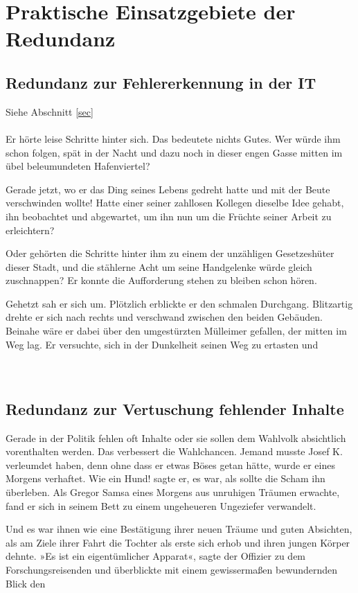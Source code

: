 \documentclass[a4paper,11pt]{article}
\begin{document}
\section{Praktische Einsatzgebiete der Redundanz} 

\subsection{ Redundanz zur Fehlererkennung in der IT}
Siehe Abschnitt \ref{sec}\\
\\
Er hörte leise Schritte hinter sich.  Das bedeutete nichts Gutes.
Wer würde ihm schon folgen, spät in der Nacht und dazu noch in
dieser engen Gasse mitten im übel beleumundeten Hafenviertel?

Gerade jetzt, wo er das Ding seines Lebens gedreht hatte und mit der
Beute verschwinden wollte! Hatte einer seiner zahllosen Kollegen
dieselbe Idee gehabt, ihn beobachtet und abgewartet, um ihn nun
um die Früchte seiner Arbeit zu erleichtern?

Oder gehörten die Schritte hinter ihm zu einem der unzähligen
Gesetzeshüter dieser Stadt, und die stählerne Acht um seine
Handgelenke würde gleich zuschnappen?
Er konnte die Aufforderung stehen zu bleiben schon hören.

Gehetzt sah er sich um.
Plötzlich erblickte er den schmalen Durchgang.
Blitzartig drehte er sich nach rechts und verschwand zwischen
den beiden Gebäuden.
Beinahe wäre er dabei über den umgestürzten Mülleimer
gefallen, der mitten im Weg lag.
Er versuchte, sich in der Dunkelheit seinen Weg zu ertasten und \\
\\
\\


\subsection{ Redundanz zur Vertuschung fehlender Inhalte}

Gerade in der Politik fehlen oft Inhalte oder sie sollen dem Wahlvolk
absichtlich vorenthalten werden.
Das verbessert die Wahlchancen.
Jemand musste Josef K.
 verleumdet haben, denn ohne dass er etwas
Böses getan hätte, wurde er eines Morgens verhaftet.
Wie ein Hund! sagte er, es war, als sollte die Scham ihn überleben.
Als Gregor Samsa eines Morgens aus unruhigen Träumen erwachte,
fand er sich in seinem Bett zu einem ungeheueren Ungeziefer verwandelt.

Und es war ihnen wie eine Bestätigung ihrer neuen Träume und guten
Absichten, als am Ziele ihrer Fahrt die Tochter als erste sich erhob
und ihren jungen Körper dehnte.
»Es ist ein eigentümlicher Apparat«, sagte der Offizier zu dem
Forschungsreisenden und überblickte mit einem gewissermaßen
bewundernden Blick den \\
\\
\\
\\
\\
\end{document}
